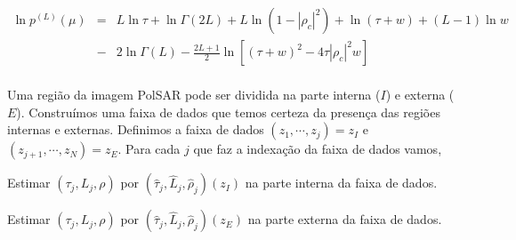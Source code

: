 \documentclass[remotesensing,article,submit,moreauthors,pdftex]{Definitions/mdpi}
\begin{document}
\begin{equation}\label{eqn64}
\begin{array}{ccl}
	\ln p^{(L)}(\mu)&=&L\ln\tau+\ln\Gamma(2L) +L\ln(1-|\rho_c|^2)+\ln(\tau+w)+(L-1)\ln w\\
	&-&2\ln\Gamma(L)-\frac{2L+1}{2}\ln\left[(\tau+w)^2-4\tau|\rho_c|^2w \right]\\
\end{array}
\end{equation}

Uma região da imagem PolSAR pode ser dividida na parte interna ($I$) e externa ($E$). Construímos uma faixa de dados que temos certeza da presença das regiões internas e externas. Definimos a faixa de dados $(z_1, \cdots,z_j)= z_I$ e $(z_{j+1}, \cdots,z_N)= z_E$. Para cada $j$ que faz a indexação da faixa de dados vamos,
  
Estimar $(\tau_j, L_j, \rho )$ por $(\hat{\tau}_j, \hat{L}_j, \hat{\rho}_j)(z_I)$ na parte interna da faixa de dados.

Estimar $(\tau_j, L_j, \rho )$ por $(\hat{\tau}_j, \hat{L}_j, \hat{\rho}_j)(z_E)$ na parte externa da faixa de dados.
\end{document}

